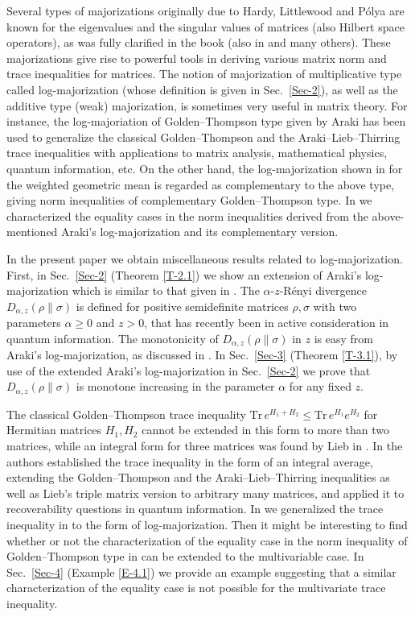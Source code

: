 \documentclass[11pt,reqno]{article}
\numberwithin{equation}{section}
\def\Tr{\mathrm{Tr}}
\begin{document}
Several types of majorizations originally due to Hardy, Littlewood and P\'olya are known for the
eigenvalues and the singular values of matrices (also Hilbert space operators), as was fully clarified in the
book \cite{MOA} (also in \cite{An,Bh,Hi0,Hi1} and many others). These majorizations give rise to powerful
tools in deriving various matrix norm and trace inequalities for matrices. The notion of majorization of
multiplicative type called log-majorization (whose definition is given in Sec.~\ref{Sec-2}), as well as
the additive type (weak) majorization, is sometimes very useful in matrix theory. For instance, the
log-majoriation of Golden--Thompson type given by Araki \cite{Ar} has been used to generalize the classical
Golden--Thompson and the Araki--Lieb--Thirring trace inequalities with applications to matrix analysis,
mathematical physics, quantum information, etc. On the other hand, the log-majorization shown in \cite{AH}
for the weighted geometric mean is regarded as complementary to the above type, giving norm inequalities of
complementary Golden--Thompson type. In \cite{Hi} we characterized the equality cases in the norm
inequalities derived from the above-mentioned Araki's log-majorization and its complementary version.

In the present paper we obtain miscellaneous results related to log-majorization. First, in Sec.~\ref{Sec-2}
(Theorem \ref{T-2.1}) we show an extension of Araki's log-majorization which is similar to that given in \cite{Hi2}.
The $\alpha$-$z$-R\'enyi divergence $D_{\alpha,z}(\rho\|\sigma)$ is defined for positive semidefinite matrices
$\rho,\sigma$ with two parameters $\alpha\ge0$ and $z>0$, that has recently been in active consideration in
quantum information. The monotonicity of $D_{\alpha,z}(\rho\|\sigma)$ in $z$ is easy from Araki's
log-majorization, as discussed in \cite{LT,MH2}. In Sec.~\ref{Sec-3} (Theorem \ref{T-3.1}), by use of the
extended Araki's log-majorization in Sec.~\ref{Sec-2} we prove that $D_{\alpha,z}(\rho\|\sigma)$ is monotone
increasing in the parameter $\alpha$ for any fixed $z$.

The classical Golden--Thompson trace inequality $\Tr\,e^{H_1+H_2}\le\Tr\,e^{H_1}e^{H_2}$ for Hermitian
matrices $H_1,H_2$ cannot be extended in this form to more than two matrices, while an integral form for
three matrices was found by Lieb in \cite{Li}. In \cite{SBT} the authors established the trace inequality in the
form of an integral average, extending the Golden--Thompson and the Araki--Lieb--Thirring inequalities
as well as Lieb's triple matrix version to arbitrary many matrices, and applied it to recoverability questions in
quantum information. In \cite{HKT} we generalized the trace inequality in \cite{SBT} to the form of
log-majorization. Then it might be interesting to find whether or not the characterization of the equality case in
the norm inequality of Golden--Thompson type in \cite{Hi} can be extended to the multivariable case. In
Sec.~\ref{Sec-4} (Example \ref{E-4.1}) we provide an example suggesting that a similar characterization of
the equality case is not possible for the multivariate trace inequality.
\end{document}
